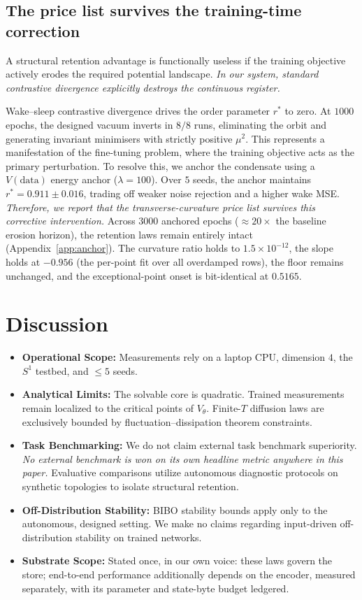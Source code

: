 \documentclass{article}
\begin{document}
\subsection{The price list survives the training-time correction}\label{sec:cure}

A structural retention advantage is functionally useless if the training objective actively erodes the required potential landscape. \emph{In our system, standard contrastive divergence explicitly destroys the continuous register.}

Wake--sleep contrastive divergence drives the order parameter $r^*$ to zero. At $1000$ epochs, the designed vacuum inverts in $8/8$ runs, eliminating the orbit and generating invariant minimisers with strictly positive $\mu^2$. This represents a manifestation of the fine-tuning problem, where the training objective acts as the primary perturbation. To resolve this, we anchor the condensate using a $V(\text{data})$ energy anchor ($\lambda=100$). Over $5$ seeds, the anchor maintains $r^*=0.911\pm0.016$, trading off weaker noise rejection and a higher wake MSE. \emph{Therefore, we report that the transverse-curvature price list survives this corrective intervention.} Across $3000$ anchored epochs ($\approx20\times$ the baseline erosion horizon), the retention laws remain entirely intact (Appendix~\ref{app:anchor}). The curvature ratio holds to $1.5\!\times\!10^{-12}$, the slope holds at $-0.956$ (the per-point fit over all overdamped rows), the floor remains unchanged, and the exceptional-point onset is bit-identical at $0.5165$.

\section{Discussion}\label{sec:discussion}

\begin{itemize}
    \item \textbf{Operational Scope:} Measurements rely on a laptop CPU, dimension $4$, the $S^1$ testbed, and $\le5$ seeds.
    \item \textbf{Analytical Limits:} The solvable core is quadratic. Trained measurements remain localized to the critical points of $V_\theta$. Finite-$T$ diffusion laws are exclusively bounded by fluctuation--dissipation theorem constraints.
    \item \textbf{Task Benchmarking:} We do not claim external task benchmark superiority. \emph{No external benchmark is won on its own headline metric anywhere in this paper.} Evaluative comparisons utilize autonomous diagnostic protocols on synthetic topologies to isolate structural retention.
    \item \textbf{Off-Distribution Stability:} BIBO stability bounds apply only to the autonomous, designed setting. We make no claims regarding input-driven off-distribution stability on trained networks.
    \item \textbf{Substrate Scope:} Stated once, in our own voice: these laws govern the store; end-to-end performance additionally depends on the encoder, measured separately, with its parameter and state-byte budget ledgered.
\end{itemize}
\end{document}
